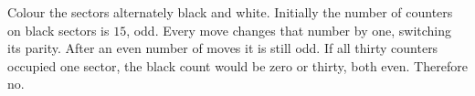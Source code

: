 Colour the sectors alternately black and white. Initially the number of counters on black sectors is $15$, odd. Every move changes that number by one, switching its parity. After an even number of moves it is still odd. If all thirty counters occupied one sector, the black count would be zero or thirty, both even. Therefore $\boxed{\text{no}}$.
